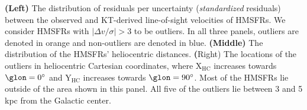 \label{fig:outliers}
\textbf{(Left)} The distribution of residuals per uncertainty (\textit{standardized} residuals) between the observed and KT-derived line-of-sight velocities of HMSFRs. We consider HMSFRs with $\vert \Delta v / \sigma \vert > 3$ to be outliers. In all three panels, outliers are denoted in orange and non-outliers are denoted in blue. \textbf{(Middle)} The distribution of the HMSFRs' heliocentric distances. \textbf({Right}) The locations of the outliers in heliocentric Cartesian coordinates, where $\mathrm{X_{HC}}$ increases towards $\glon=0^\circ$ and $\mathrm{Y_{HC}}$ increases towards $\glon=90^\circ$. Most of the HMSFRs lie outside of the area shown in this panel. All five of the outliers lie between 3 and 5 kpc from the Galactic center.